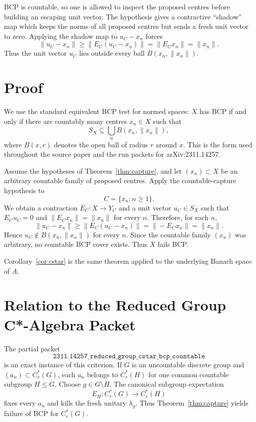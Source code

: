 \documentclass[11pt]{article}
\newcommand{\Cr}{C^*_r}
\begin{document}
BCP is countable, so one is allowed to inspect the proposed centres before
building an escaping unit vector.  The hypothesis gives a contractive
``shadow'' map which keeps the norms of all proposed centres but sends a fresh
unit vector to zero.  Applying the shadow map to \(u_C-x_n\) forces
\[
        \|u_C-x_n\|\ge \|E_C(u_C-x_n)\|=\|E_Cx_n\|=\|x_n\|.
\]
Thus the unit vector \(u_C\) lies outside every ball \(B(x_n,\|x_n\|)\).

\section*{Proof}

We use the standard equivalent BCP test for normed spaces: \(X\) has BCP if
and only if there are countably many centres \(x_n\in X\) such that
\[
        S_X\subseteq \bigcup_n B(x_n,\|x_n\|),
\]
where \(B(x,r)\) denotes the open ball of radius \(r\) around \(x\).  This is
the form used throughout the source paper and the run packets for
arXiv:2311.14257.

Assume the hypotheses of Theorem~\ref{thm:capture}, and let
\((x_n)\subset X\) be an arbitrary countable family of proposed centres.
Apply the countable-capture hypothesis to
\[
        C=\{x_n:n\ge 1\}.
\]
We obtain a contraction \(E_C:X\to Y_C\) and a unit vector \(u_C\in S_X\) such
that \(E_Cu_C=0\) and \(\|E_Cx_n\|=\|x_n\|\) for every \(n\).  Therefore,
for each \(n\),
\[
        \|u_C-x_n\|
        \ge
        \|E_C(u_C-x_n)\|
        =
        \|-E_Cx_n\|
        =
        \|x_n\|.
\]
Hence \(u_C\notin B(x_n,\|x_n\|)\) for every \(n\).  Since the countable
family \((x_n)\) was arbitrary, no countable BCP cover exists.  Thus \(X\)
fails BCP.

Corollary~\ref{cor:cstar} is the same theorem applied to the underlying
Banach space of \(A\).

\section*{Relation to the Reduced Group C*-Algebra Packet}

The partial packet
\[
\texttt{2311.14257\_reduced\_group\_cstar\_bcp\_countable}
\]
is an exact instance of this criterion.  If \(G\) is an uncountable discrete
group and \((a_n)\subset \Cr(G)\), each \(a_n\) belongs to \(\Cr(H)\) for one
common countable subgroup \(H\le G\).  Choose \(g\in G\setminus H\).  The
canonical subgroup expectation
\[
        E_H:\Cr(G)\to \Cr(H)
\]
fixes every \(a_n\) and kills the fresh unitary \(\lambda_g\).  Thus
Theorem~\ref{thm:capture} yields failure of BCP for \(\Cr(G)\).
\end{document}
